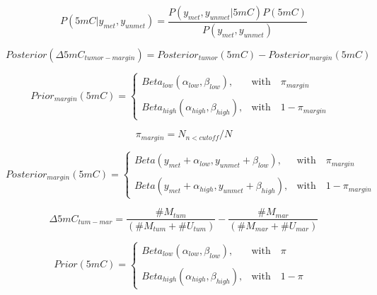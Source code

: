 \documentclass[a4paper]{article}
\begin{document}

\begin{equation*}
P(5mC | y_{met}, y_{unmet}) = \frac{ P(y_{met}, y_{unmet} | 5mC) P(5mC)} { P(y_{met}, y_{unmet}) }
\end{equation*}

\newpage
\begin{equation*}
Posterior(\Delta 5mC_{tumor - margin}) = Posterior_{tumor}(5mC) - Posterior_{margin}(5mC)
\end{equation*}

\newpage
\begin{equation*}
Prior_{margin}(5mC) = 
\begin{cases} 
Beta_{low}(\alpha_{low}, \beta_{low}), & \mbox{with } \mbox{ $\pi_{margin}$ } \\
\\
Beta_{high}(\alpha_{high}, \beta_{high}), & \mbox{with } \mbox{ $1 - \pi_{margin}$ }
\end{cases}
\end{equation*}

\begin{equation*}
\pi_{margin} = N_{n < cutoff} / N
\end{equation*}

\newpage

\begin{equation*}
Posterior_{margin}(5mC) = 
\begin{cases} 
Beta(y_{met} + \alpha_{low}, y_{unmet} + \beta_{low}) , & \mbox{with } \mbox{ $\pi_{margin}$ } \\
\\
Beta(y_{met} + \alpha_{high}, y_{unmet} + \beta_{high}), & \mbox{with } \mbox{ $1 - \pi_{margin}$ }
\end{cases}
\end{equation*}


\newpage
\begin{equation*}
\Delta 5mC_{tum - mar} = \frac{\#M_{tum}}{(\#M_{tum} + \#U_{tum})} - 
    \frac{\#M_{mar}}{(\#M_{mar} + \#U_{mar})}
\end{equation*}

\newpage
\begin{equation*}
Prior(5mC) = 
\begin{cases} 
Beta_{low}(\alpha_{low}, \beta_{low}), & \mbox{with } \mbox{ $\pi$ } \\
\\
Beta_{high}(\alpha_{high}, \beta_{high}), & \mbox{with } \mbox{ $1 - \pi$ }
\end{cases}
\end{equation*}
\end{document}

